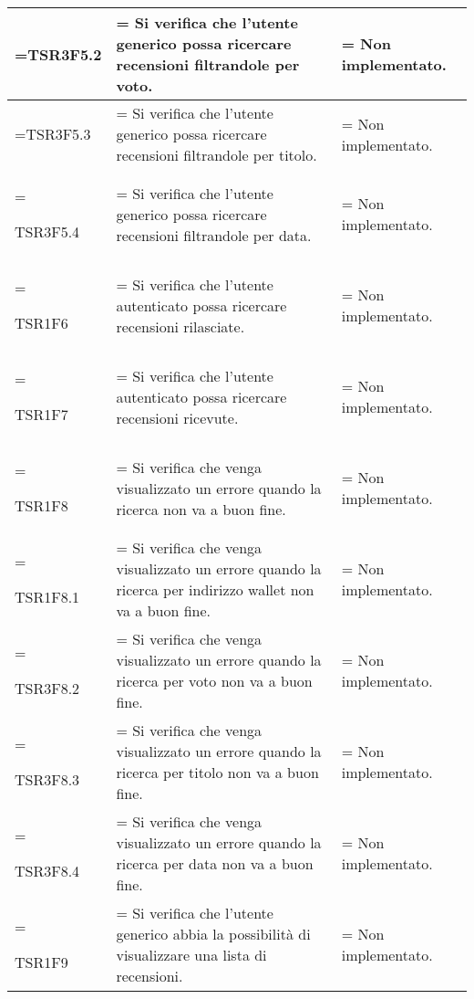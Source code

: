 \begin{xltabular}{\textwidth} {
            >{\hsize\linewidth=\hsize}X
            >{\hsize\linewidth=\hsize}X
            >{\hsize\linewidth=\hsize}X
        }
        TSR3F5.2&
        Si verifica che l'utente generico possa ricercare recensioni filtrandole per voto.&
        Non implementato.
        \\ \hline
        
        TSR3F5.3&
        Si verifica che l'utente generico possa ricercare recensioni filtrandole per titolo.&
        Non implementato.
        \\ \hline

        TSR3F5.4&
        Si verifica che l'utente generico possa ricercare recensioni filtrandole per data.&
        Non implementato.
        \\ \hline

        TSR1F6&
        Si verifica che l'utente autenticato possa ricercare recensioni rilasciate. &
        Non implementato.
        \\ \hline

        TSR1F7&
        Si verifica che l'utente autenticato possa ricercare recensioni ricevute. &
        Non implementato.
        \\ \hline
        
        TSR1F8&
        Si verifica che venga visualizzato un errore quando la ricerca non va a buon fine. &
        Non implementato.
        \\ \hline

        TSR1F8.1&
        Si verifica che venga visualizzato un errore quando la ricerca per indirizzo wallet non va a buon fine. &
        Non implementato.
        \\ \hline
        
        TSR3F8.2&
        Si verifica che venga visualizzato un errore quando la ricerca per voto non va a buon fine. &
        Non implementato.
        \\ \hline
        
        TSR3F8.3&
        Si verifica che venga visualizzato un errore quando la ricerca per titolo non va a buon fine. &
        Non implementato.
        \\ \hline

        TSR3F8.4&
        Si verifica che venga visualizzato un errore quando la ricerca per data non va a buon fine. &
        Non implementato.
        \\ \hline

        TSR1F9 &
        Si verifica che l'utente generico abbia la possibilità di visualizzare una lista di recensioni.  &
        Non implementato.
        \\ \hline


\end{xltabular}
